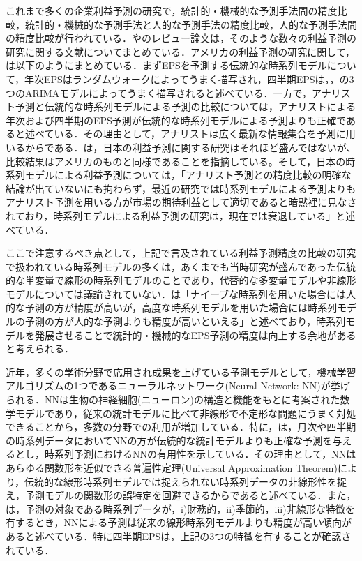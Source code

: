 \documentclass[a4paper，12pt]{jsarticle}
\begin{document}
これまで多くの企業利益予測の研究で，統計的・機械的な予測手法間の精度比較，統計的・機械的な予測手法と人的な予測手法の精度比較，人的な予測手法間の精度比較が行われている．\cite{sakurai1990}や\cite{ota2006}のレビュー論文は，そのような数々の利益予測の研究に関する文献についてまとめている．アメリカの利益予測の研究に関して，\cite{sakurai1990}は以下のようにまとめている．まずEPSを予測する伝統的な時系列モデルについて，年次EPSはランダムウォークによってうまく描写され，四半期EPSは\cite*{brown1979univariate}，\cite{griffin1977time}，\cite{foster1977quarterly}の3つのARIMAモデルによってうまく描写されると述べている．一方で，アナリスト予測と伝統的な時系列モデルによる予測の比較については，アナリストによる年次および四半期のEPS予測が伝統的な時系列モデルによる予測よりも正確であると述べている．その理由として，アナリストは広く最新な情報集合を予測に用いるからである．\cite{ota2006}は，日本の利益予測に関する研究はそれほど盛んではないが、比較結果はアメリカのものと同様であることを指摘している。そして，日本の時系列モデルによる利益予測については，「アナリスト予測との精度比較の明確な結論が出ていないにも拘わらず，最近の研究では時系列モデルによる予測よりもアナリスト予測を用いる方が市場の期待利益として適切であると暗黙裡に見なされており，時系列モデルによる利益予測の研究は，現在では衰退している」と述べている．

ここで注意するべき点として，上記で言及されている利益予測精度の比較の研究で扱われている時系列モデルの多くは，あくまでも当時研究が盛んであった伝統的な単変量で線形の時系列モデルのことであり，代替的な多変量モデルや非線形モデルについては議論されていない．\cite{ota2006}は「ナイーブな時系列を用いた場合には人的な予測の方が精度が高いが，高度な時系列モデルを用いた場合には時系列モデルの予測の方が人的な予測よりも精度が高いといえる」と述べており，時系列モデルを発展させることで統計的・機械的なEPS予測の精度は向上する余地があると考えられる．

近年，多くの学術分野で応用され成果を上げている予測モデルとして，機械学習アルゴリズムの1つであるニューラルネットワーク(Neural Network: NN)が挙げられる．NNは生物の神経細胞(ニューロン)の構造と機能をもとに考案された数学モデルであり，従来の統計モデルに比べて非線形で不定形な問題にうまく対処できることから，多数の分野での利用が増加している\citep*{tkavc2016artificial}．特に，\cite{hill1996neural}は，月次や四半期の時系列データにおいてNNの方が伝統的な統計モデルよりも正確な予測を与えるとし，時系列予測におけるNNの有用性を示している．その理由として，NNはあらゆる関数形を近似できる普遍性定理(Universal Approximation Theorem)\citep{hornik1989multilayer}により，伝統的な線形時系列モデルでは捉えられない時系列データの非線形性を捉え，予測モデルの関数形の誤特定を回避できるからであると述べている．また，\cite{hill1994artificial}は，予測の対象である時系列データが，i)財務的，ii)季節的，iii)非線形な特徴を有するとき，NNによる予測は従来の線形時系列モデルよりも精度が高い傾向があると述べている．特に四半期EPSは，上記の3つの特徴を有することが確認されている\citep*{hopwood1986univariate}．
\end{document}
